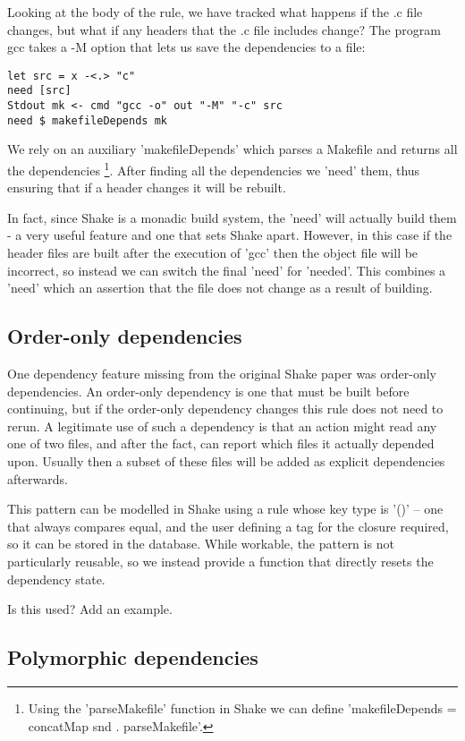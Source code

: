 Looking at the body of the rule, we have tracked what happens if the .c file changes, but what if any headers that the .c file includes change? The program gcc takes a -M option that lets us save the dependencies to a file:

\begin{lstlisting}
let src = x -<.> "c"
need [src]
Stdout mk <- cmd "gcc -o" out "-M" "-c" src
need $ makefileDepends mk
\end{lstlisting}

We rely on an auxiliary \lst'makefileDepends' which parses a Makefile and returns all the dependencies \footnote{Using the \lst'parseMakefile' function in Shake we can define \lst'makefileDepends = concatMap snd . parseMakefile'.}. After finding all the dependencies we \lst'need' them, thus ensuring that if a header changes it will be rebuilt.

In fact, since Shake is a monadic build system, the \lst'need' will actually build them - a very useful feature and one that sets Shake apart. However, in this case if the header files are built after the execution of \lst'gcc' then the object file will be incorrect, so instead we can switch the final \lst'need' for \lst'needed'. This combines a \lst'need' which an assertion that the file does not change as a result of building.


\subsection{Order-only dependencies}

One dependency feature missing from the original Shake paper was order-only dependencies. An order-only dependency is one that must be built before continuing, but if the order-only dependency changes this rule does not need to rerun. A legitimate use of such a dependency is that an action might read any one of two files, and after the fact, can report which files it actually depended upon. Usually then a subset of these files will be added as explicit dependencies afterwards.

This pattern can be modelled in Shake using a rule whose key type is \lst'()' -- one that always compares equal, and the user defining a tag for the closure required, so it can be stored in the database. While workable, the pattern is not particularly reusable, so we instead provide a function that directly resets the dependency state.

Is this used? Add an example.


\subsection{Polymorphic dependencies}

